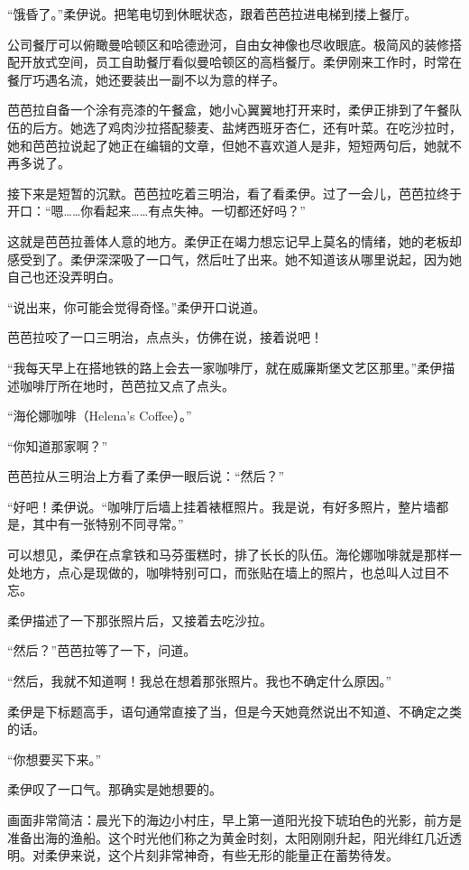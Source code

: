 “饿昏了。”柔伊说。把笔电切到休眠状态，跟着芭芭拉进电梯到搂上餐厅。

公司餐厅可以俯瞰曼哈顿区和哈德逊河，自由女神像也尽收眼底。极简风的装修搭配开放式空间，员工自助餐厅看似曼哈顿区的高档餐厅。柔伊刚来工作时，时常在餐厅巧遇名流，她还要装出一副不以为意的样子。

芭芭拉自备一个涂有亮漆的午餐盒，她小心翼翼地打开来时，柔伊正排到了午餐队伍的后方。她选了鸡肉沙拉搭配藜麦、盐烤西班牙杏仁，还有叶菜。在吃沙拉时，她和芭芭拉说起了她正在编辑的文章，但她不喜欢道人是非，短短两句后，她就不再多说了。

接下来是短暂的沉默。芭芭拉吃着三明治，看了看柔伊。过了一会儿，芭芭拉终于开口：“嗯……你看起来……有点失神。一切都还好吗？”

这就是芭芭拉善体人意的地方。柔伊正在竭力想忘记早上莫名的情绪，她的老板却感受到了。柔伊深深吸了一口气，然后吐了出来。她不知道该从哪里说起，因为她自己也还没弄明白。

“说出来，你可能会觉得奇怪。”柔伊开口说道。

芭芭拉咬了一口三明治，点点头，仿佛在说，接着说吧！

“我每天早上在搭地铁的路上会去一家咖啡厅，就在威廉斯堡文艺区那里。”柔伊描述咖啡厅所在地时，芭芭拉又点了点头。

“海伦娜咖啡（Helena’s Coffee）。”

“你知道那家啊？”

芭芭拉从三明治上方看了柔伊一眼后说：“然后？”

“好吧！柔伊说。“咖啡厅后墙上挂着裱框照片。我是说，有好多照片，整片墙都是，其中有一张特别不同寻常。”

可以想见，柔伊在点拿铁和马芬蛋糕时，排了长长的队伍。海伦娜咖啡就是那样一处地方，点心是现做的，咖啡特别可口，而张贴在墙上的照片，也总叫人过目不忘。

柔伊描述了一下那张照片后，又接着去吃沙拉。

“然后？”芭芭拉等了一下，问道。

“然后，我就不知道啊！我总在想着那张照片。我也不确定什么原因。”

柔伊是下标题高手，语句通常直接了当，但是今天她竟然说出不知道、不确定之类的话。

“你想要买下来。”

柔伊叹了一口气。那确实是她想要的。

画面非常简洁：晨光下的海边小村庄，早上第一道阳光投下琥珀色的光影，前方是准备出海的渔船。这个时光他们称之为黄金时刻，太阳刚刚升起，阳光绯红几近透明。对柔伊来说，这个片刻非常神奇，有些无形的能量正在蓄势待发。

